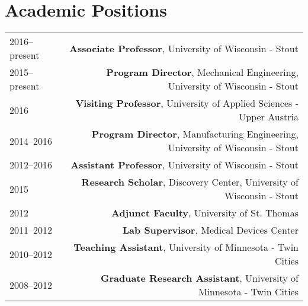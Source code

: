 \section*{Academic Positions}
\begin{tabular}{L!{\VRule}R}
2016--present&{\bf Associate Professor}, University of Wisconsin - Stout\\
2015--present&{\bf Program Director}, Mechanical Engineering, University of Wisconsin - Stout\\
2016&\textbf{Visiting Professor}, University of Applied Sciences - Upper Austria\\
2014--2016&{\bf Program Director}, Manufacturing Engineering, University of Wisconsin - Stout\\
2012--2016&{\bf Assistant Professor}, University of Wisconsin - Stout\\
2015&{\bf Research Scholar}, Discovery Center, University of Wisconsin - Stout\\
2012&\textbf{Adjunct Faculty}, University of St. Thomas\\
2011--2012&\textbf{Lab Supervisor}, Medical Devices Center\\
2010--2012&\textbf{Teaching Assistant}, University of Minnesota - Twin Cities\\
2008--2012&\textbf{Graduate Research Assistant}, University of Minnesota - Twin Cities\\
\end{tabular}